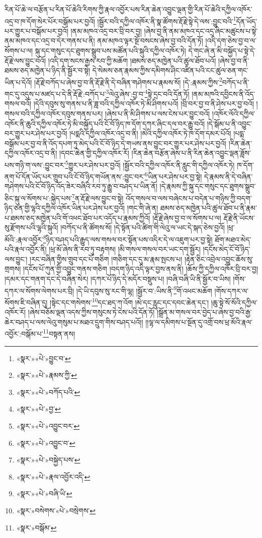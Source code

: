 རིན་པོ་ཆེ་ལ་བརྩོན་པ་རིན་པོ་ཆེའི་རིགས་ཀྱི་རྣལ་འབྱོར་པས་རིན་ཆེན་འབྱུང་ལྡན་གྱི་རིན་པོ་ཆེའི་དཀྱིལ་འཁོར་འདྲ་བ་ཁ་དོག་སེར་པོར་བསྒོམ་པར་བྱའོ། །སྦྱོར་བའི་དཀྱིལ་འཁོར་ནི་སྣ་ཚོགས་རྡོ་རྗེ་སྟེ་དེ་ལས་:བྱུང་བའི་\footnote{«སྣར་»«པེ་»བྱུང་བ་}དོན་ཡོད་པར་གྱུར་པ་བསྒོམ་པར་བྱའོ། །ནམ་མཁའ་འདྲ་བར་བྲི་བར་བྱ། །ཞེས་བྱ་ནི་ནམ་མཁའ་དང་འདྲ་ཞིང་མཚུངས་པ་སྟེ་ནམ་མཁའ་དང་འདྲ་བ་དེར་གནས་པ་ནི། ནམ་མཁའ་ལྟར་སྔོ་བསངས་ཞེས་བྱ་བའི་དོན་ཏོ། །འདི་དག་ཅེས་བྱ་བ་ལ་སོགས་པ་ལ། སྐུ་དང་གསུང་དང་ཐུགས་སྒྲུབ་པས་མཚོན་པའི་སྐུའི་དཀྱིལ་འཁོར་ཏེ། དེ་གང་ཞེ་ན་མི་བསྐྱོད་པ་སྟེ་དེ་རྡོ་རྗེ་ལས་བྱུང་བའོ། །འདི་དག་སངས་རྒྱས་རབ་ཀྱི་མཆོག །ཐམས་ཅད་མཁྱེན་པའི་ཚུལ་ཐོབ་པའོ། །ཞེས་བྱ་བ་ནི་ཐམས་ཅད་མཁྱེན་པ་ཉིད་ནི་སྦྱོར་བ་སྟེ། དེ་སེམས་ཅན་རྣམས་ཀྱིས་དམིགས་ཤིང་འཛིན་པའི་ངང་ཚུལ་ཅན་གང་ཡིན་པ་དེའོ། །རྡོ་རྗེ་བཀོད་པ་ཞེས་བྱ་བ་ནི་རྡོ་རྗེ་ནི་དེ་བཞིན་གཤེགས་པ་རྣམས་སོ། །དེ་:རྣམས་ཀྱིས་\footnote{«སྣར་»«པེ་»རྣམས་ཀྱི་}བཀོད་པ་ནི་གང་དུ་འདུས་པ་མཛད་པ་དེ་ནི་རྡོ་རྗེ་:བཀོད་པ་\footnote{«སྣར་»«པེ་»བཀོད་པའི་}ལེའུ་ཞེས་:བྱ་བ་\footnote{«སྣར་»«པེ་»བྱ་}སྟེ་དྲང་བའི་དོན་ཏོ། །ནམ་མཁའི་དབྱིངས་ནི་འོད་གསལ་བའོ། །དེའི་དབུས་སུ་གནས་པ་ནི་ཟླ་བའི་དཀྱིལ་འཁོར་ཏེ་མི་ཤིགས་པའོ། །བྲི་བར་བྱ་བ་ནི་ཤེས་པར་བྱ་བའོ། །གསལ་བའི་དཀྱིལ་འཁོར་དབུས་གནས་པར། །ཞེས་པ་ནི་མི་ཤིགས་པ་ལས་ངེས་པར་བྱུང་བའོ། །འཁོར་ལོའི་དཀྱིལ་འཁོར་ནི་ཆུའི་དཀྱིལ་འཁོར་ཏེ་མི་བསྐྱོད་པའི་ངོ་བོ་ཉིད་ཁ་དོག་དཀར་ཞིང་དལ་བར་རྒྱུ་བའོ། །དེ་སྒོམ་པ་ནི་འབྱུང་བར་གྱུར་པར་ཤེས་པར་བྱའོ། །པདྨའི་དཀྱིལ་འཁོར་འདྲ་བ་ནི། །མེའི་དཀྱིལ་འཁོར་ཏེ་ཁ་དོག་དམར་པོའོ། །པདྨ་བསྒོམ་པར་བྱ་བ་ནི་འོད་དཔག་ཏུ་མེད་པའི་ངོ་བོ་ཉིད་དེ་གཡས་ནས་བྱུང་བར་གྱུར་པར་ཤེས་པར་བྱའོ། །རིན་ཆེན་དཀྱིལ་འཁོར་འདྲ་བ་ནི། །དབང་ཆེན་གྱི་དཀྱིལ་འཁོར་རོ། །རིན་ཆེན་བརྩོན་ཞེས་པ་ནི་རིན་ཆེན་འབྱུང་ལྡན་ཟློས་པས་གཉི་ག་ལས་:བྱུང་བར་\footnote{«སྣར་»«པེ་»འབྱུང་བར་}གྱུར་པར་ཤེས་པར་བྱའོ། །སྦྱོར་བའི་དཀྱིལ་འཁོར་ནི་རླུང་གི་དཀྱིལ་འཁོར་ཏེ། ཁ་དོག་ནག་པོ་དོན་ཡོད་པར་གྲུབ་པའི་ངོ་བོ་ཉིད་གཡོན་ནས་:བྱུང་བར་\footnote{«སྣར་»«པེ་»འབྱུང་བ་}ཡིན་པར་ཤེས་པར་བྱ་སྟེ། དེ་རྣམས་ནི་དེ་བཞིན་གཤེགས་པའི་ངོ་བོ་ཉིད་འོད་ཟེར་བཞིའི་རབ་ཏུ་རྒྱུ་བ་བཤད་པ་ཡིན་ནོ། །དེ་རྣམས་ཀྱི་སྐུ་དང་གསུང་དང་ཐུགས་སྒྲུབ་ཅིང་སྐུ་ལ་སོགས་པ་:སྐྱེད་པས་\footnote{«སྣར་»«པེ་»བསྐྱེད་པས་}ན་རྡོ་རྗེ་ལས་བྱུང་བ་སྟེ། འོད་གསལ་བ་ལས་བཞེངས་པ་བདེན་པ་གཉིས་ཀྱི་བདག་ཉིད་ཅན་གྱི་ལྷའི་དཀྱིལ་འཁོར་ཡིན་པར་ཤེས་པར་བྱའོ། །གང་གི་ཞེ་ན། ཐམས་ཅད་མཁྱེན་པའི་ཚུལ་ཐོབ་པ་ནི་རྣམ་པ་ཐམས་ཅད་མཁྱེན་པའི་གོ་འཕང་ཐོབ་པར་འདོད་པ་རྣམས་ཀྱིའོ། །རྡོ་རྗེ་ཞེས་བྱ་བ་ལ་སོགས་པ་ལ། རྡོ་རྗེ་ནི་ཡོངས་སུ་རྫོགས་པའི་ལྷའི་སྐུའོ། །བཀོད་པ་ནི་ཚོགས་སོ། །དེ་སྟོན་པའི་ཚིག་གི་ལེའུ་ལ་ཡང་དེ་སྐད་ཅེས་བྱའོ། །ཕྲ་མོའི་:རྣལ་འབྱོར་\footnote{«སྣར་»«པེ་»རྣལ་འབྱོར་འདི་}ཉིད་བཤད་པའི་རྒྱུད་ལས་གསལ་བར་སྟོན་པས་འདིར་དེ་ལ་འཇུག་པར་བྱ་སྟེ། ཐོག་མཐའ་མེད་པའི་རྣལ་འབྱོར་ནི། །ཕྲ་མོ་ཞེས་ནི་རབ་ཏུ་བརྟགས། །མི་གསལ་གསལ་བར་ཡང་དག་སྦྱོར། །དངོས་མེད་ངོ་བོ་ཉིད་ལས་བྱུང་། །རང་བཞིན་གྱིས་གྲུབ་དང་པོ་གཅིག །གཅིག་དང་དུ་མ་རྣམ་སྤངས་པ། །རྟེན་ཅིང་འབྲེལ་འབྱུང་ཆོས་སུ་གྲགས། །དངོས་པོ་ཀུན་གྱི་འབྱུང་གནས་གཅིག །བདག་ཉིད་འདི་ལྟར་བྱས་ནས་ནི། །ཆོས་ཀྱི་དཀྱིལ་འཁོར་བྲི་བར་བྱ། །དམར་དང་གནག་དང་དེ་བཞིན་སེར། །དཀར་པོ་ཉིད་དེ་མདོར་བསྡུས་པ། །བཞི་བཞི་ཡི་ནི་སྦྱོར་བ་ཡིས། །གོས་དཀར་ལ་སོགས་ལེགས་པར་བྲི། །དེ་ཡི་དབུས་སུ་རང་གི་ལྷ། །སྦྱོར་བ་:ཡིས་ནི་\footnote{«སྣར་»«པེ་»བཞི་ཡི་}གོ་འཕང་མཆོག །གོས་དཀར་ལ་སོགས་ཇི་བཞིན་དུ། །སྟེང་དང་གསེགས་\footnote{«སྣར་»བསེགས་«པེ་»བསྲེགས་}དང་ཐད་ཀ་འོག །མེ་དང་རླུང་དང་དབང་ཆེན་དང་། །ཆུ་སྟེ་སོ་སོའི་དཀྱིལ་འཁོར་རོ། །ཞེས་བཅོམ་ལྡན་འདས་ཀྱིས་གསུངས་ཏེ་ངེས་པའི་དོན་ཏོ། །སྒྲོན་མ་གསལ་བར་བྱེད་པ་ཞེས་བྱ་བའི་རྒྱ་ཆེར་བཤད་པ་ལས་ལེའུ་གསུམ་པ་མཐའ་དྲུག་གིས་བཤད་པའོ།། །།ལྷ་ལ་དམིགས་པ་སྔོན་དུ་འགྲོ་བས་ཕྲ་མོའི་རྣལ་འབྱོར་:བསྒོམ་པ་\footnote{«སྣར་»བསྒོམ་}བསྟན་ནས། 